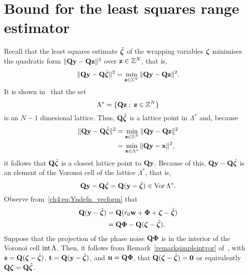 \section{Bound for the least squares range estimator}\label{ch4:sec:robustness-bound}

Recall that the least squares estimate $\hat{\boldsymbol{\zeta}}$ of the wrapping variables $\boldsymbol{\zeta}$ minimises the quadratic form $\|\mathbf{Q} \mathbf{y} - \mathbf{Q} \mathbf{z}\|^2$ over $\mathbf{z} \in {\mathbb Z}^N$, that is,
\[
\|\mathbf{Q} \mathbf{y} - \mathbf{Q} \hat{\boldsymbol{\zeta}}\|^2 = \min_{\mathbf{z} \in {\mathbb Z}^N} \|\mathbf{Q} \mathbf{y} - \mathbf{Q} \mathbf{z}\|^2.
\]
It is shown in~ that the set
\[
\Lambda^* = \{ \mathbf{Q}\mathbf{z} \; ; \; \mathbf{z} \in {\mathbb Z}^N  \}
\]
is an $N-1$ dimesional lattice.  Thus, $\mathbf{Q}\hat{\boldsymbol{\zeta}}$ is a lattice point in $\Lambda^*$ and, because 
\begin{align*}
\|\mathbf{Q} \mathbf{y} - \mathbf{Q} \hat{\boldsymbol{\zeta}}\|^2 &= \min_{\mathbf{z} \in {\mathbb Z}^N} \|\mathbf{Q} \mathbf{y} -  \mathbf{Q} \mathbf{z}\|^2 \\
&= \min_{\mathbf{x} \in \Lambda^*} \|\mathbf{Q} \mathbf{y} - \mathbf{x}\|^2,
\end{align*}
it follows that $\mathbf{Q} \hat{\boldsymbol{\zeta}}$ is a closest lattice point to $\mathbf{Q}\mathbf{y}$.  Because of this, $\mathbf{Q} \mathbf{y} - \mathbf{Q} \hat{\boldsymbol{\zeta}}$ is an element of the Voronoi cell of the lattice $\Lambda^*$, that is,
\[
\mathbf{Q} \mathbf{y} - \mathbf{Q} \hat{\boldsymbol{\zeta}} = \mathbf{Q} ( \mathbf{y} -  \hat{\boldsymbol{\zeta}} ) \in \operatorname{Vor} \Lambda^*.
\]
Observe from~\ref{ch4:eq:Yndefn_vecform} that
\begin{align*}
\mathbf{Q} (\mathbf{y} - \hat{\boldsymbol{\zeta}}) &= \mathbf{Q} (r_0\mathbf{w} + \boldsymbol{\Phi} + \boldsymbol{\zeta} - \hat{\boldsymbol{\zeta}}) \\
&= \mathbf{Q} \boldsymbol{\Phi} - \mathbf{Q}(\boldsymbol{\zeta} - \hat{\boldsymbol{\zeta}}).
\end{align*}
Suppose that the projection of the phase noise $\mathbf{Q} \boldsymbol{\Phi}$ is in the interior of the Voronoi cell $\operatorname{int} \Lambda$.  Then, it follows from Remark~\ref{remarksimpleintvor} of~, with $\mathbf{s} = \mathbf{Q}(\boldsymbol{\zeta} - \hat{\boldsymbol{\zeta}})$, $\mathbf{t} = \mathbf{Q} (\mathbf{y} - \hat{\boldsymbol{\zeta}})$, and $\mathbf{u} = \mathbf{Q} \boldsymbol{\Phi}$, that $\mathbf{Q}(\boldsymbol{\zeta} - \hat{\boldsymbol{\zeta}}) = \boldsymbol{0}$ or equivalently $\mathbf{Q}\boldsymbol{\zeta} =\mathbf{Q}\hat{\boldsymbol{\zeta}}$.


